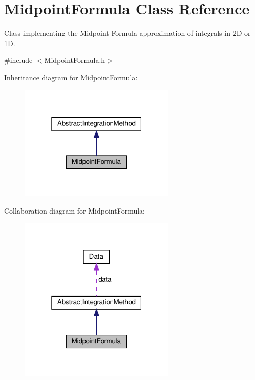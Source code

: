 \hypertarget{class_midpoint_formula}{}\section{Midpoint\+Formula Class Reference}
\label{class_midpoint_formula}


Class implementing the Midpoint Formula approximation of integrals in 2D or 1D.  




{\ttfamily \#include $<$Midpoint\+Formula.\+h$>$}



Inheritance diagram for Midpoint\+Formula\+:\nopagebreak
\begin{figure}[H]
\begin{center}
\leavevmode
\includegraphics[width=211pt]{class_midpoint_formula__inherit__graph}
\end{center}
\end{figure}


Collaboration diagram for Midpoint\+Formula\+:\nopagebreak
\begin{figure}[H]
\begin{center}
\leavevmode
\includegraphics[width=211pt]{class_midpoint_formula__coll__graph}
\end{center}
\end{figure}
